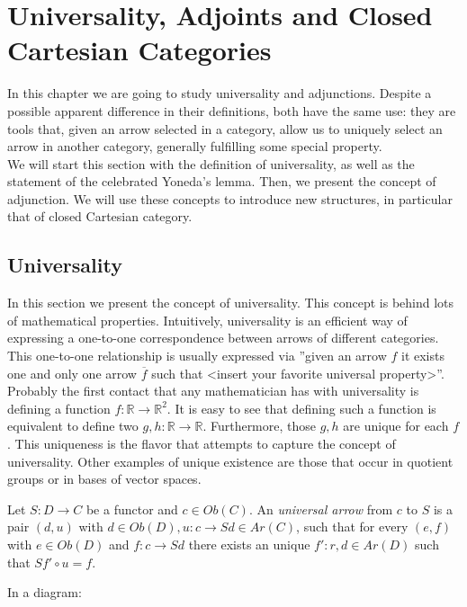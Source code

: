 
\chapter{Universality, Adjoints and Closed Cartesian Categories}
\thispagestyle{empty}
In this chapter we are going to study universality and adjunctions. Despite a possible apparent difference in their definitions, both have the same use: they are tools that, given an arrow selected in a category, allow us to uniquely select an arrow in another category, generally fulfilling some special property. \\

We will start this section with the definition of universality, as well as the statement of the celebrated Yoneda's lemma. Then, we present the concept of adjunction. We will use these concepts to introduce new structures, in particular that of closed Cartesian category.


\section{Universality}
In this section we present the concept of universality. This concept is behind lots of mathematical properties. Intuitively, universality is an efficient way of expressing a one-to-one correspondence between arrows of different categories. This one-to-one relationship is usually expressed via ''given an arrow  $f$ it exists one and only one  arrow $\overline f$ such that <insert your favorite universal property>''.\\

Probably the first contact that any mathematician has with universality is defining a function  $f:\mathbb R \to \mathbb R^2$. It is easy to see that defining such a function is equivalent to define two $g,h: \mathbb R \to \mathbb R$. Furthermore, those $g,h$ are unique for each $f$. This uniqueness is the flavor that attempts to capture the concept of universality. Other examples of unique existence are those that occur in quotient groups or in bases of vector spaces. \\

\begin{definition}\label{def:univ-arrow}
  Let $S: D \to C$ be a functor and $c \in Ob(C)$. An \emph{universal arrow}  from $c$ to $S$ is a pair $(d,u)$ with $d\in Ob(D), u:c \to Sd \in Ar(C)$, such that for every $(e,f)$ with $e\in Ob(D)$  and $f:c\to Sd$ there exists an unique $f':r,d\in Ar(D)$ such that $Sf'\circ u = f$.

\end{definition}
In a diagram:

